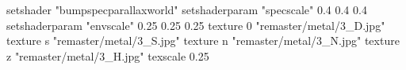 setshader "bumpspecparallaxworld"
setshaderparam "specscale" 0.4 0.4 0.4
setshaderparam "envscale"  0.25 0.25 0.25
    texture 0 "remaster/metal/3_D.jpg"
    texture s "remaster/metal/3_S.jpg"
    texture n "remaster/metal/3_N.jpg"
    texture z "remaster/metal/3_H.jpg"
    texscale 0.25